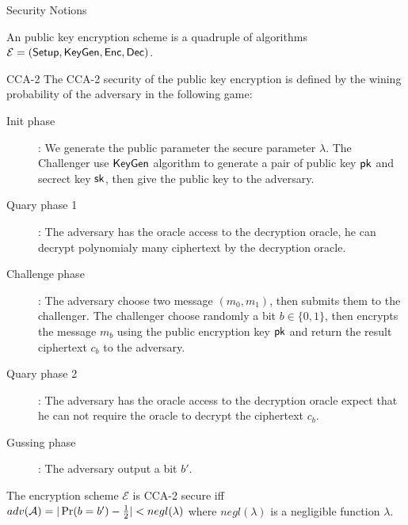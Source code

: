\begin{subsection}{Security Notions}

  
  An public key encryption scheme is a quadruple of algorithms $\mathcal{E} = ({\mathsf{Setup}}, {\mathsf{KeyGen}}, {\mathsf{Enc}}, {\mathsf{Dec}})$.

  \begin{myDef}{CCA-2}
  The CCA-2 security of the public key encryption is defined by the wining probability of the adversary in the following game:
  \begin{description}
  \item[Init phase]:
    We generate the public parameter \wrt the secure parameter $\lambda$. The Challenger use ${\mathsf{KeyGen}}$ algorithm to generate a pair of public key $\mathsf{pk}$ and secrect key $\mathsf{sk}$, then give the public key to the adversary.
  \item[Quary phase 1]: The adversary has the oracle access to the decryption oracle, he can decrypt polynomialy many ciphertext by the decryption oracle.
  \item[Challenge phase]: The adversary choose two message $(m_0, m_1)$, then submits them to the challenger. The challenger choose randomly a bit $b \in \{0,1\}$, then encrypts the message $m_b$ using the public encryption key $\mathsf{pk}$ and return the result ciphertext $c_b$ to the adversary.
  \item[Quary phase 2]: The adversary has the oracle access to the decryption oracle expect that he can not require the oracle to decrypt the ciphertext $c_b$.
  \item[Gussing phase]: The adversary output a bit $b'$.
  \end{description}

  The encryption scheme $\mathcal{E}$ is CCA-2 secure iff $adv(\mathcal{A}) = |\operatorname{Pr}(b = b') - \frac{1}{2}| < negl(\lambda)$ where $negl(\lambda)$ is a negligible function \wrt $\lambda$.
  \end{myDef}


\end{subsection}
